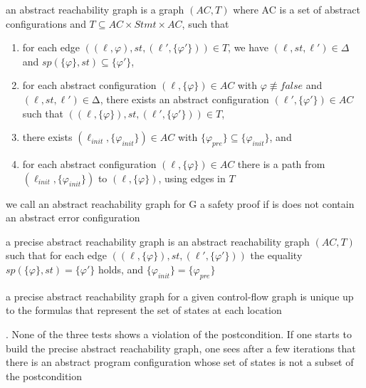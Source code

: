 \documentclass[landscape, a4paper]{article}
\begin{document}
\begin{minipage}[t]{0.2\linewidth}
\begin{betterlist}
		\item an \alert{abstract reachability graph} is a graph $(AC, T)$ where AC is a set of abstract configurations and $T ⊆AC × Stmt × AC$, such that
		\begin{enumerate}
			\item for each edge $((\ell, {\varphi}), st, (\ell', \{\varphi'\})) \in T$, we have $(\ell, st, \ell') \in \Delta$ and $sp(\{\varphi\}, st) \subseteq \{\varphi'\}$,
			\item for each abstract configuration $(\ell, \{\varphi\}) \in AC$ with $\varphi\not\equiv false$ and $(\ell, st, \ell') \in ∆$, there exists an abstract configuration $(\ell', \{\varphi'\}) \in AC$ such that $((\ell, \{\varphi\}), st, (\ell', \{\varphi'\})) \in T$,
			\item there exists $(\ell_{init}, \{\varphi_{init}\}) \in AC$ with $\{\varphi_{pre}\} \subseteq \{\varphi_{init}\}$, and
			\item for each abstract configuration $(\ell, \{\varphi\}) \in AC$ there is a path from $(\ell_{init}, \{\varphi_{init}\})$ to $(\ell, \{\varphi\})$, using edges in $T$
		\end{enumerate}
		\begin{betterlist}
			\item we call an abstract reachability graph for G a \alert{safety proof} if is does not contain an abstract error configuration
			\begin{betterlist}
				\item {}
			\end{betterlist}
		\end{betterlist}
		\item a \alert{precise abstract reachability graph} is an abstract reachability graph $(AC, T)$ such that for each edge $((\ell, \{\varphi\}), st, (\ell', \{\varphi'\}))$ the equality $sp(\{\varphi\}, st) = \{\varphi'\}$ holds, and $\{\varphi_{init}\} = \{\varphi_{pre}\}$
		\begin{betterlist}
			\item a precise abstract reachability graph for a given control-flow graph is unique up to the formulas that represent the set of states at each location
			\item {}. None of the three tests shows a violation of the postcondition. If one starts to build the precise abstract reachability graph, one sees after a few iterations that there is an abstract program configuration whose set of states is not a subset of the postcondition

\end{betterlist}
\end{betterlist}
\end{minipage}
\end{document}
